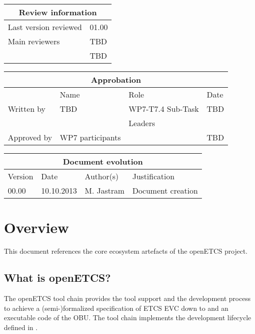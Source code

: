 \documentclass{template/openetcs_report}
\begin{document}
\begin{tabular}{|p{4.4cm}|p{8.7cm}|}
\hline
\multicolumn{2}{|c|}{Review information} \\
\hline
Last version reviewed & 01.00 \\
\hline
Main reviewers & TBD \\
& TBD \\
\hline
\end{tabular}

\begin{tabular}{|p{2.2cm}|p{4cm}|p{4cm}|p{2cm}|}
\hline
\multicolumn{4}{|c|}{Approbation} \\
\hline
  &  Name & Role & Date   \\
\hline  
Written by    &  TBD & WP7-T7.4 Sub-Task  & TBD \\
&  & Leaders&\\
\hline
Approved by & WP7 participants &   & TBD \\
\hline
\end{tabular}

\begin{tabular}{|p{2.2cm}|p{2cm}|p{3cm}|p{5cm}|}
\hline
\multicolumn{4}{|c|}{Document evolution} \\
\hline
Version &  Date & Author(s) & Justification  \\
\hline  
00.00 & 10.10.2013 & M. Jastram  &  Document creation  \\


\hline  
\end{tabular}
\newpage


\mainmatter
\chapter{Overview}

This document references the core ecosystem artefacts of the openETCS project.

\section{What is openETCS?}

The openETCS tool chain provides the tool support and the development process to achieve a (semi-)formalized
specification of ETCS EVC down to and an executable code of the
OBU. The tool chain implements the development lifecycle defined in \cite{D2.3}.
\end{document}
